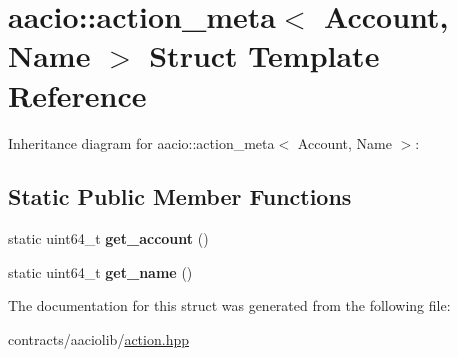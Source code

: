 \hypertarget{structaacio_1_1action__meta}{}\section{aacio\+:\+:action\+\_\+meta$<$ Account, Name $>$ Struct Template Reference}
\label{structaacio_1_1action__meta}


Inheritance diagram for aacio\+:\+:action\+\_\+meta$<$ Account, Name $>$\+:
\subsection*{Static Public Member Functions}
\begin{DoxyCompactItemize}
\item 
\mbox{\label{structaacio_1_1action__meta_a07a05600bf6eb239d1e147ca53dc6ade}} 
static uint64\+\_\+t {\bfseries get\+\_\+account} ()
\item 
\mbox{\label{structaacio_1_1action__meta_aa359044cb04aefa1e44b00a4ab404f1a}} 
static uint64\+\_\+t {\bfseries get\+\_\+name} ()
\end{DoxyCompactItemize}


The documentation for this struct was generated from the following file\+:\begin{DoxyCompactItemize}
\item 
contracts/aaciolib/\mbox{\hyperlink{action_8hpp}{action.\+hpp}}\end{DoxyCompactItemize}
